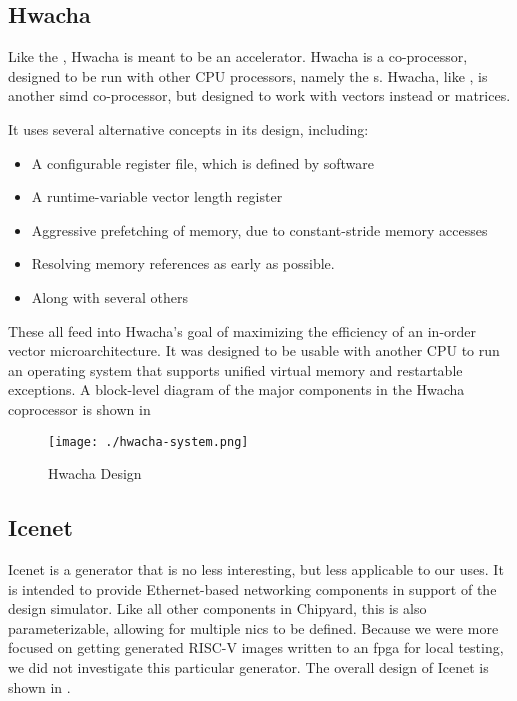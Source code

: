 \subsection{Hwacha}\label{sec:Hwacha}
\nocite{hwachaGithub}
\nocite{hwachaPresentation}
Like the , Hwacha is meant to be an accelerator.
Hwacha is a co-processor, designed to be run with other CPU processors, namely the s.
Hwacha, like , is another \gls{simd} co-processor, but designed to work with vectors instead or matrices.

It uses several alternative concepts in its design, including:
\begin{itemize}
\item A configurable register file, which is defined by software
\item A runtime-variable vector length register
\item Aggressive prefetching of memory, due to constant-stride memory accesses
\item Resolving memory references as early as possible.
\item Along with several others
\end{itemize}

These all feed into Hwacha's goal of maximizing the efficiency of an in-order vector microarchitecture.
It was designed to be usable with another CPU to run an operating system that supports unified virtual memory and restartable exceptions.
A block-level diagram of the major components in the Hwacha coprocessor is shown in 

\begin{figure}[h!tbp]
  \centering
  \texttt{[image: ./hwacha-system.png]}
  \caption{Hwacha Design~\cite[p.~11]{hwachaPresentation}}
  \label{fig:Hwacha_Accelerator}
\end{figure}

\subsection{Icenet}\label{sec:Icenet_Generator}
\nocite{icenetGithub}
Icenet is a generator that is no less interesting, but less applicable to our uses.
It is intended to provide Ethernet-based networking components in support of the  design simulator.
Like all other components in Chipyard, this is also parameterizable, allowing for multiple \Glspl{nic} to be defined.
Because we were more focused on getting generated RISC-V images written to an \Gls{fpga} for local testing, we did not investigate this particular generator.
The overall design of Icenet is shown in .

